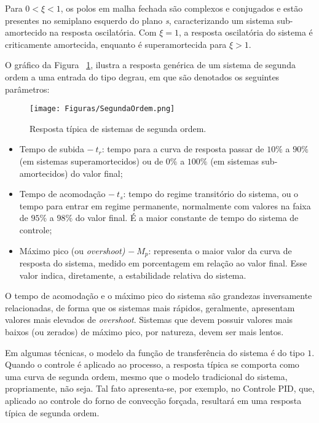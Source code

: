         Para $0 < \xi < 1$, os polos em malha fechada são complexos e conjugados e estão presentes no semiplano esquerdo do plano \textit{s}, caracterizando um sistema sub-amortecido na resposta oscilatória. Com $\xi = 1$, a resposta oscilatória do sistema é criticamente amortecida, enquanto é superamortecida para $\xi > 1$.
        
        O gráfico da Figura ~\ref{fig:Resposta2Ordem}, ilustra a resposta genérica de um sistema de segunda ordem a uma entrada do tipo degrau, em que são denotados os seguintes parâmetros:
        \begin{figure}[H]
            \centering
            \texttt{[image: Figuras/SegundaOrdem.png]}
            \caption{Resposta típica de sistemas de segunda ordem.} \label{fig:Resposta2Ordem} 
        \end{figure}
        
        \begin{itemize}
            \item Tempo de subida $- \ t _r$: tempo para a curva de resposta passar de $10\%$ a $90\%$ (em sistemas superamortecidos) ou de $0\%$ a $100\%$ (em sistemas sub-amortecidos) do valor final;
            \item Tempo de acomodação $- \ t_s$: tempo do regime transitório do sistema, ou o tempo para entrar em regime permanente, normalmente com valores na faixa de $95\%$ a $98\%$ do valor final. É a maior constante de tempo do sistema de controle;
            \item Máximo pico (ou \textit{overshoot)} $- \ M_p$: representa o maior valor da curva de resposta do sistema, medido em porcentagem em relação ao valor final. Esse valor indica, diretamente, a estabilidade relativa do sistema.
        \end{itemize}
        
    O tempo de acomodação e o máximo pico do sistema são grandezas inversamente relacionadas, de forma que os sistemas mais rápidos, geralmente, apresentam valores mais elevados de \textit{overshoot}. Sistemas que devem possuir valores mais baixos (ou zerados) de máximo pico, por natureza, devem ser mais lentos.
        
    Em algumas técnicas, o modelo da função de transferência do sistema é do tipo $1$. Quando o controle é aplicado ao processo, a resposta típica se comporta como uma curva de segunda ordem, mesmo que o modelo tradicional do sistema, propriamente, não seja. Tal fato apresenta-se, por exemplo, no Controle PID, que, aplicado ao controle do forno de convecção forçada, resultará em uma resposta típica de segunda ordem.
